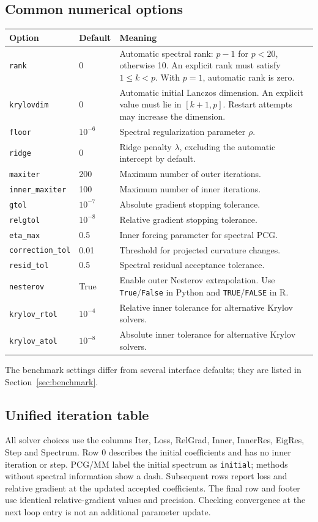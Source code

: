 \documentclass[11pt,a4paper]{article}
\newcommand{\code}[1]{\texttt{#1}}
\begin{document}
\subsection{Common numerical options}
\small
\begin{longtable}{@{}p{.24\linewidth}p{.16\linewidth}p{.54\linewidth}@{}}
\toprule
Option & Default & Meaning \\
\midrule
\endhead
\code{rank} & 0 & Automatic spectral rank: $p-1$ for $p<20$, otherwise 10.
An explicit rank must satisfy $1\leq k<p$. With $p=1$, automatic rank is zero. \\
\code{krylovdim} & 0 & Automatic initial Lanczos dimension. An explicit value
must lie in $[k+1,p]$. Restart attempts may increase the dimension. \\
\code{floor} & $10^{-6}$ & Spectral regularization parameter $\rho$. \\
\code{ridge} & 0 & Ridge penalty $\lambda$, excluding the automatic intercept by default. \\
\code{maxiter} & 200 & Maximum number of outer iterations. \\
\code{inner\_maxiter} & 100 & Maximum number of inner iterations. \\
\code{gtol} & $10^{-7}$ & Absolute gradient stopping tolerance. \\
\code{relgtol} & $10^{-8}$ & Relative gradient stopping tolerance. \\
\code{eta\_max} & 0.5 & Inner forcing parameter for spectral PCG. \\
\code{correction\_tol} & 0.01 & Threshold for projected curvature changes. \\
\code{resid\_tol} & 0.5 & Spectral residual acceptance tolerance. \\
\code{nesterov} & True & Enable outer Nesterov extrapolation. Use
\code{True}/\code{False} in Python and \code{TRUE}/\code{FALSE} in R. \\
\code{krylov\_rtol} & $10^{-4}$ & Relative inner tolerance for alternative
Krylov solvers. \\
\code{krylov\_atol} & $10^{-8}$ & Absolute inner tolerance for alternative
Krylov solvers. \\
\bottomrule
\end{longtable}
\normalsize
The benchmark settings differ from several interface defaults; they are listed
in Section~\ref{sec:benchmark}.

\subsection{Unified iteration table}
All solver choices use the columns Iter, Loss, RelGrad, Inner, InnerRes, EigRes,
Step and Spectrum. Row 0 describes the initial coefficients and has no inner
iteration or step. PCG/MM label the initial spectrum as \code{initial}; methods
without spectral information show a dash. Subsequent rows report loss and
relative gradient at the updated accepted coefficients. The final row and footer
use identical relative-gradient values and precision. Checking convergence at
the next loop entry is not an additional parameter update.
\end{document}
